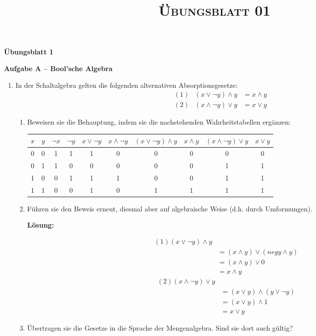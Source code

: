 \documentclass[paper=a4,fontsize=11pt]{scrartcl}%
\title{	
\normalfont \normalsize 
\textsc{Übungsblatt 01}
}
\numberwithin{equation}{section}
\newenvironment{solution}
	{
		\color{Blue}
		\textbf{Lösung:}
	}{}
\begin{document}
\vspace*{-1cm}
\begin{center}
\Large{\textbf{Übungsblatt 1}}
\end{center}
\begin{center}\Large{\textbf{Aufgabe A -- Bool'sche Algebra}}\end{center}

\begin{enumerate}
	\item In der Schaltalgebra gelten die folgenden alternativen Absorptionsgesetze:
	\begin{align*}
		(1) & (x \lor \neg y) \land y &= x \land y\\
		(2) & (x \land \neg y) \lor y &= x \lor y
	\end{align*}
	\begin{enumerate}
		\item Beweisen sie die Behauptung, indem sie die nachstehenden Wahrheitstabellen ergänzen:
	\begin{center}
	\begin{table}[ht]
	\centering
\begin{tabular}{|c|c|c|c|c|c|c|c|c|c|}
\hline
 $x$ & $y$ & $\neg x$ & $\neg y$ & $x \lor \neg y$ & $x \land \neg y$ & $(x \lor \neg y) \land y$ & $x \land y$ & $(x \land \neg y) \lor y$ & $x \lor y$ \\ \hline
0 & 0 & 1 & 1 & 1 & 0 & 0 & 0 & 0 & 0 \\ \hline
0 & 1 & 1 & 0 & 0 & 0 & 0 & 0 & 1 & 1 \\ \hline
1 & 0 & 0 & 1 & 1 & 1 & 0 & 0 & 1 & 1 \\ \hline
1 & 1 & 0 & 0 & 1 & 0 & 1 & 1 & 1 & 1 \\ \hline
\end{tabular}
\end{table}
	\end{center}
		\item Führen sie den Beweis erneut, diesmal aber auf algebraische Weise (d.h. durch Umformungen).
		
		\begin{solution}
		
		\begin{align*}
		(1) (x \lor \neg y) \land y &\\
		&= (x \land y) \lor (neg y \land y)\\
		&= (x \land y) \lor 0\\
		&= x \land y
		\end{align*}
		\begin{align*}
		(2) (x \land \neg y) \lor y & \\
		&= (x \lor y) \land (y \lor \neg y)\\
		&= (x \lor y) \land 1\\
		&= x \lor y
		\end{align*}
		\end{solution}
		\item Übertragen sie die Gesetze in die Sprache der Mengenalgebra. Sind sie dort auch gültig?
		

\end{enumerate}
\end{enumerate}
\end{document}
